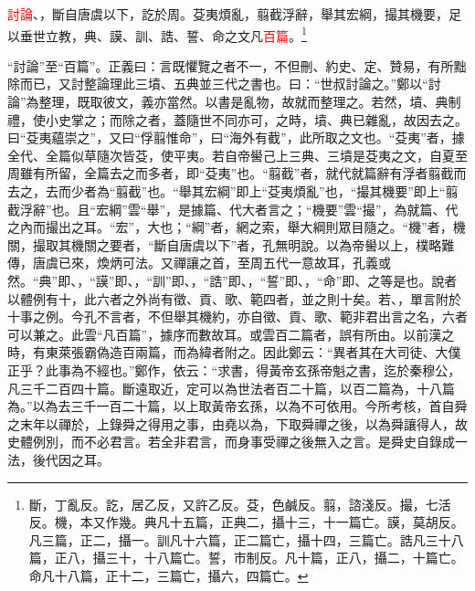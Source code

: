 \textcolor{red}{討論}、，斷自唐虞以下，訖於周。芟夷煩亂，翦截浮辭，舉其宏綱，撮其機要，足以垂世立教，典、謨、訓、誥、誓、命之文凡\textcolor{red}{百篇}。\footnote{斷，丁亂反。訖，居乙反，又許乙反。芟，色鹹反。翦，諮淺反。撮，七活反。機，本又作幾。典凡十五篇，正典二，攝十三，十一篇亡。謨，莫胡反。凡三篇，正二，攝一。訓凡十六篇，正二篇亡，攝十四，三篇亡。誥凡三十八篇，正八，攝三十，十八篇亡。誓，市制反。凡十篇，正八，攝二，十篇亡。命凡十八篇，正十二，三篇亡，攝六，四篇亡。}

{\noindent\shu{}\fzkt “討論”至“百篇”。正義曰：言既懼覽之者不一，不但刪、約史、定、贊易，有所黜除而已，又討整論理此三墳、五典並三代之書也。曰：“世叔討論之。”鄭以“討論”為整理，既取彼文，義亦當然。以書是亂物，故就而整理之。若然，墳、典制禮，使小史掌之；而除之者，蓋隨世不同亦可，之時，墳、典已雜亂，故因去之。曰“芟夷蘊崇之”，又曰“俘翦惟命”，曰“海外有截”，此所取之文也。“芟夷”者，據全代、全篇似草隨次皆芟，使平夷。若自帝嚳己上三典、三墳是芟夷之文，自夏至周雖有所留，全篇去之而多者，即“芟夷”也。“翦截”者，就代就篇辭有浮者翦截而去之，去而少者為“翦截”也。“舉其宏綱”即上“芟夷煩亂”也，“撮其機要”即上“翦截浮辭”也。且“宏綱”雲“舉”，是據篇、代大者言之；“機要”雲“撮”，為就篇、代之內而撮出之耳。“宏”，大也；“綱”者，網之索，舉大綱則眾目隨之。“機”者，機關，撮取其機關之要者，“斷自唐虞以下”者，孔無明說。以為帝嚳以上，樸略難傳，唐虞已來，煥炳可法。又禪讓之首，至周五代一意故耳，孔義或然。“典”即、，“謨”即、，“訓”即、，“誥”即、，“誓”即、，“命”即、之等是也。說者以體例有十，此六者之外尚有徵、貢、歌、範四者，並之則十矣。若、，單言附於十事之例。今孔不言者，不但舉其機約，亦自徵、貢、歌、範非君出言之名，六者可以兼之。此雲“凡百篇”，據序而數故耳。或雲百二篇者，誤有所由。以前漢之時，有東萊張霸偽造百兩篇，而為緯者附之。因此鄭云：“異者其在大司徒、大僕正乎？此事為不經也。”鄭作，依云：“求書，得黃帝玄孫帝魁之書，迄於秦穆公，凡三千二百四十篇。斷遠取近，定可以為世法者百二十篇，以百二篇為，十八篇為。”以為去三千一百二十篇，以上取黃帝玄孫，以為不可依用。今所考核，首自舜之末年以禪於，上錄舜之得用之事，由堯以為，下取舜禪之後，以為舜讓得人，故史體例別，而不必君言。若全非君言，而身事受禪之後無入之言。是舜史自錄成一法，後代因之耳。 \par}

